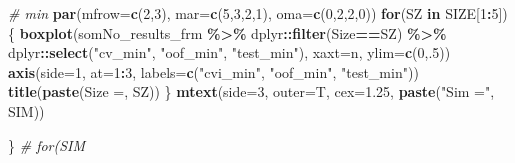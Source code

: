 \documentclass[
]{book}
\newenvironment{Shaded}{\begin{snugshade}}{\end{snugshade}}
\newcommand{\CommentTok}[1]{\textcolor[rgb]{0.56,0.35,0.01}{\textit{#1}}}
\newcommand{\ControlFlowTok}[1]{\textcolor[rgb]{0.13,0.29,0.53}{\textbf{#1}}}
\newcommand{\DataTypeTok}[1]{\textcolor[rgb]{0.13,0.29,0.53}{#1}}
\newcommand{\DecValTok}[1]{\textcolor[rgb]{0.00,0.00,0.81}{#1}}
\newcommand{\FloatTok}[1]{\textcolor[rgb]{0.00,0.00,0.81}{#1}}
\newcommand{\KeywordTok}[1]{\textcolor[rgb]{0.13,0.29,0.53}{\textbf{#1}}}
\newcommand{\NormalTok}[1]{#1}
\newcommand{\OperatorTok}[1]{\textcolor[rgb]{0.81,0.36,0.00}{\textbf{#1}}}
\newcommand{\StringTok}[1]{\textcolor[rgb]{0.31,0.60,0.02}{#1}}
\begin{document}
\begin{Shaded}
\begin{Highlighting}[]
\CommentTok{\# min}
\KeywordTok{par}\NormalTok{(}\DataTypeTok{mfrow=}\KeywordTok{c}\NormalTok{(}\DecValTok{2}\NormalTok{,}\DecValTok{3}\NormalTok{), }\DataTypeTok{mar=}\KeywordTok{c}\NormalTok{(}\DecValTok{5}\NormalTok{,}\DecValTok{3}\NormalTok{,}\DecValTok{2}\NormalTok{,}\DecValTok{1}\NormalTok{), }\DataTypeTok{oma=}\KeywordTok{c}\NormalTok{(}\DecValTok{0}\NormalTok{,}\DecValTok{2}\NormalTok{,}\DecValTok{2}\NormalTok{,}\DecValTok{0}\NormalTok{))}
\ControlFlowTok{for}\NormalTok{(SZ }\ControlFlowTok{in}\NormalTok{ SIZE[}\DecValTok{1}\OperatorTok{:}\DecValTok{5}\NormalTok{]) \{}
  \KeywordTok{boxplot}\NormalTok{(somNo\_results\_frm }\OperatorTok{\%>\%}\StringTok{ }\NormalTok{dplyr}\OperatorTok{::}\KeywordTok{filter}\NormalTok{(Size}\OperatorTok{==}\NormalTok{SZ) }
    \OperatorTok{\%>\%}\StringTok{ }\NormalTok{dplyr}\OperatorTok{::}\KeywordTok{select}\NormalTok{(}\StringTok{"cv\_min"}\NormalTok{, }\StringTok{"oof\_min"}\NormalTok{, }\StringTok{"test\_min"}\NormalTok{),}
    \DataTypeTok{xaxt=}\StringTok{\textquotesingle{}n\textquotesingle{}}\NormalTok{, }\DataTypeTok{ylim=}\KeywordTok{c}\NormalTok{(}\DecValTok{0}\NormalTok{,.}\DecValTok{5}\NormalTok{))}
   \KeywordTok{axis}\NormalTok{(}\DataTypeTok{side=}\DecValTok{1}\NormalTok{, }\DataTypeTok{at=}\DecValTok{1}\OperatorTok{:}\DecValTok{3}\NormalTok{, }\DataTypeTok{labels=}\KeywordTok{c}\NormalTok{(}\StringTok{"cvi\_min"}\NormalTok{, }\StringTok{"oof\_min"}\NormalTok{, }\StringTok{"test\_min"}\NormalTok{))}
   \KeywordTok{title}\NormalTok{(}\KeywordTok{paste}\NormalTok{(}\StringTok{\textquotesingle{}Size =\textquotesingle{}}\NormalTok{, SZ))}
\NormalTok{\}}
\KeywordTok{mtext}\NormalTok{(}\DataTypeTok{side=}\DecValTok{3}\NormalTok{, }\DataTypeTok{outer=}\NormalTok{T, }\DataTypeTok{cex=}\FloatTok{1.25}\NormalTok{, }\KeywordTok{paste}\NormalTok{(}\StringTok{"Sim ="}\NormalTok{, SIM))}

\NormalTok{\} }\CommentTok{\# for(SIM}
\end{Highlighting}
\end{Shaded}
\end{document}
